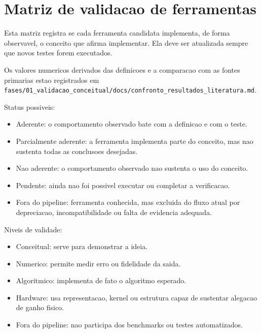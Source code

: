 

\chapter{Matriz de validacao de ferramentas}





Esta matriz registra se cada ferramenta candidata implementa, de forma observavel, o conceito que afirma implementar. Ela deve ser atualizada sempre que novos testes forem executados.




Os valores numericos derivados das definicoes e a comparacao com as fontes primarias estao registrados em \texttt{fases/\allowbreak{}01\_\allowbreak{}validacao\_\allowbreak{}conceitual/\allowbreak{}docs/\allowbreak{}confronto\_\allowbreak{}resultados\_\allowbreak{}literatura.\allowbreak{}md}.



Status possiveis:


\begin{itemize}
\item Aderente: o comportamento observado bate com a definicao e com o teste.
\item Parcialmente aderente: a ferramenta implementa parte do conceito, mas nao
sustenta todas as conclusoes desejadas.
\item Nao aderente: o comportamento observado nao sustenta o uso do conceito.
\item Pendente: ainda nao foi possivel executar ou completar a verificacao.
\item Fora do pipeline: ferramenta conhecida, mas excluida do fluxo atual por
depreciacao, incompatibilidade ou falta de evidencia adequada.
\end{itemize}


Niveis de validade:


\begin{itemize}
\item Conceitual: serve para demonstrar a ideia.
\item Numerico: permite medir erro ou fidelidade da saida.
\item Algoritmico: implementa de fato o algoritmo esperado.
\item Hardware: usa representacao, kernel ou estrutura capaz de sustentar alegacao
de ganho fisico.
\item Fora do pipeline: nao participa dos benchmarks ou testes automatizados.
\end{itemize}


